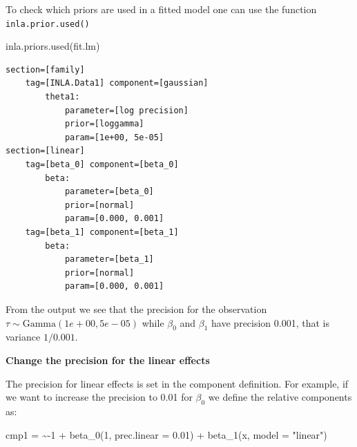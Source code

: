 \documentclass[
  letterpaper,
  DIV=11,
  numbers=noendperiod]{scrartcl}
\newenvironment{Shaded}{\begin{snugshade}}{\end{snugshade}}
\newcommand{\AttributeTok}[1]{\textcolor[rgb]{0.40,0.45,0.13}{#1}}
\newcommand{\DecValTok}[1]{\textcolor[rgb]{0.68,0.00,0.00}{#1}}
\newcommand{\ErrorTok}[1]{\textcolor[rgb]{0.68,0.00,0.00}{#1}}
\newcommand{\FloatTok}[1]{\textcolor[rgb]{0.68,0.00,0.00}{#1}}
\newcommand{\FunctionTok}[1]{\textcolor[rgb]{0.28,0.35,0.67}{#1}}
\newcommand{\NormalTok}[1]{\textcolor[rgb]{0.00,0.23,0.31}{#1}}
\newcommand{\OtherTok}[1]{\textcolor[rgb]{0.00,0.23,0.31}{#1}}
\newcommand{\SpecialCharTok}[1]{\textcolor[rgb]{0.37,0.37,0.37}{#1}}
\newcommand{\StringTok}[1]{\textcolor[rgb]{0.13,0.47,0.30}{#1}}
\begin{document}
To check which priors are used in a fitted model one can use the
function \texttt{inla.prior.used()}

\begin{Shaded}
\begin{Highlighting}[]
\FunctionTok{inla.priors.used}\NormalTok{(fit.lm)}
\end{Highlighting}
\end{Shaded}

\begin{verbatim}
section=[family]
    tag=[INLA.Data1] component=[gaussian]
        theta1:
            parameter=[log precision]
            prior=[loggamma]
            param=[1e+00, 5e-05]
section=[linear]
    tag=[beta_0] component=[beta_0]
        beta:
            parameter=[beta_0]
            prior=[normal]
            param=[0.000, 0.001]
    tag=[beta_1] component=[beta_1]
        beta:
            parameter=[beta_1]
            prior=[normal]
            param=[0.000, 0.001]
\end{verbatim}

From the output we see that the precision for the observation
\(\tau\sim\text{Gamma}(1e+00,5e-05)\) while \(\beta_0\) and \(\beta_1\)
have precision 0.001, that is variance \(1/0.001\).

\textbf{Change the precision for the linear effects}

The precision for linear effects is set in the component definition. For
example, if we want to increase the precision to 0.01 for \(\beta_0\) we
define the relative components as:

\begin{Shaded}
\begin{Highlighting}[]
\NormalTok{cmp1 }\OtherTok{=}  \ErrorTok{\textasciitilde{}}\SpecialCharTok{{-}}\DecValTok{1} \SpecialCharTok{+}  \FunctionTok{beta\_0}\NormalTok{(}\DecValTok{1}\NormalTok{, }\AttributeTok{prec.linear =} \FloatTok{0.01}\NormalTok{) }\SpecialCharTok{+} \FunctionTok{beta\_1}\NormalTok{(x, }\AttributeTok{model =} \StringTok{"linear"}\NormalTok{)}
\end{Highlighting}
\end{Shaded}
\end{document}
